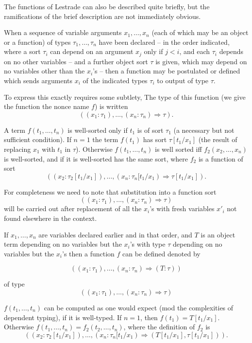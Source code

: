 \documentclass[12pt]{slides}
\begin{document}
\begin{slide}

The functions of Lestrade can also be described quite briefly, but the ramifications of the brief description are not immediately obvious.

When a sequence of variable arguments $x_1,\ldots,x_n$ (each of which may be an object or a function) of types $\tau_1,\ldots,\tau_n$ have been declared -- in the order indicated, where a sort $\tau_i$ can depend on an argument $x_j$ only if $j<i$, and each $\tau_i$ depends on no other variables -- and a further object sort $\tau$ is given, which may depend on no variables other than the $x_i$'s -- then a function may be postulated or defined which sends arguments $x_i$
of the indicated types $\tau_i$ to output of type $\tau$.

\end{slide}

\begin{slide}

To express this exactly requires some subtlety,  The type of this function (we give the function  the nonce name $f$)  is written $$((x_1:\tau_1),\ldots,(x_n:\tau_n) \Rightarrow \tau).$$

A term $f(t_1,\ldots,t_n)$ is well-sorted only if $t_1$ is of sort $\tau_1$ (a necessary but not sufficient condition).  If $n=1$ the term $f(t_1)$ has sort $\tau[t_1/x_1]$ (the result of replacing $x_1$ with $t_1$ in $\tau$).  Otherwise $f(t_1,\ldots,t_n)$ is well sorted iff $f_2(x_2,\ldots,x_n)$ is well-sorted, and if it is well-sorted has the same sort, where
$f_2$ is a function of sort $$((x_2:\tau_2[t_1/x_1]),\ldots,(x_n:\tau_n[t_1/x_1) \Rightarrow \tau[t_1/x_1]).$$

For completeness we need to note that substitution into a function sort $$((x_1:\tau_1),\ldots,(x_n:\tau_n) \Rightarrow \tau)$$ will be carried out
after replacement of all the $x_i$'s with fresh variables $x'_i$ not found elsewhere in the context.


\end{slide}

\begin{slide}

If $x_1,\ldots,x_n$ are variables declared earlier and in that order, and $T$ is an object term depending on no variables but the $x_i$'s with
type $\tau$ depending on no variables but the $x_i$'s then a function $f$ can be defined denoted by 

$$((x_1:\tau_1),\ldots,(x_n:\tau_n) \Rightarrow (T:\tau))$$

of type $$((x_1:\tau_1),\ldots,(x_n:\tau_n) \Rightarrow \tau)$$

$f(t_1,\ldots,t_n)$ can be computed as one would expect (mod the complexities of dependent typing), if it is well-typed.  If $n=1$, then
$f(t_1) = T[t_1/x_1]$.  Otherwise $f(t_1,\ldots,t_n) = f_2(t_2,\ldots,t_n)$, where the definition of $f_2$ is {\small $$((x_2:\tau_2[t_1/x_1]),\ldots,(x_n:\tau_n[t_1/x_1) \Rightarrow (T[t_1/x_1],\tau[t_1/x_1])).$$}

\end{slide}
\end{document}
